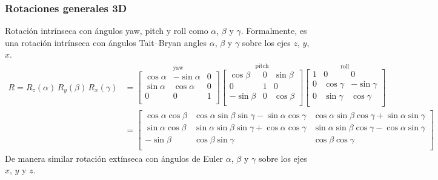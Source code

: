 \begin{frame}
    \frametitle{Rotaciones generales 3D}
    \tiny
    
    Rotación intrínseca con ángulos yaw, pitch y roll como $\alpha$, $\beta$ y $\gamma$. Formalmente, es una rotación intrínseca con ángulos Tait–Bryan angles $\alpha$, $\beta$ y $\gamma$ sobre los ejes $z$, $y$, $x$.
    \begin{equation*}
        {\displaystyle
            {
                \begin{aligned}
                    R=R_{z}(\alpha )\,R_{y}(\beta )\,R_{x}(\gamma )&={\overset {\text{yaw}}{\begin{bmatrix}\cos \alpha &-\sin \alpha &0\\\sin \alpha &\cos \alpha &0\\0&0&1\\\end{bmatrix}}}{\overset {\text{pitch}}{\begin{bmatrix}\cos \beta &0&\sin \beta \\0&1&0\\-\sin \beta &0&\cos \beta \\\end{bmatrix}}}{\overset {\text{roll}}{\begin{bmatrix}1&0&0\\0&\cos \gamma &-\sin \gamma \\0&\sin \gamma &\cos \gamma \\\end{bmatrix}}}\\
                    &={\begin{bmatrix}\cos \alpha \cos \beta &\cos \alpha \sin \beta \sin \gamma -\sin \alpha \cos \gamma &\cos \alpha \sin \beta \cos \gamma +\sin \alpha \sin \gamma \\\sin \alpha \cos \beta &\sin \alpha \sin \beta \sin \gamma +\cos \alpha \cos \gamma &\sin \alpha \sin \beta \cos \gamma -\cos \alpha \sin \gamma \\-\sin \beta &\cos \beta \sin \gamma &\cos \beta \cos \gamma \\\end{bmatrix}
                    }
                \end{aligned}
            }
        }
    \end{equation*}
    De manera similar rotación extínseca con ángulos de Euler $\alpha$, $\beta$ y $\gamma$ sobre los ejes $x$, $y$ y $z$.
    \begin{equation*}
        {\displaystyle \begin{aligned}

\end{aligned}}
\end{equation*}
\end{frame}
